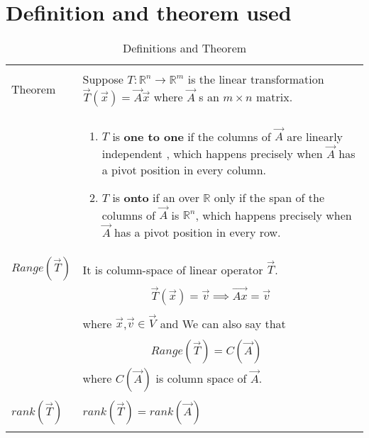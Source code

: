 \documentclass[journal,12pt]{IEEEtran}
\begin{document}
\section{\textbf{Definition and theorem used}}
\renewcommand{\thetable}{1}
\begin{table}[ht!]
\centering
\begin{tabular}{|p{3cm}|p{15cm}|}
    \hline
	\multirow{3}{*}{Theorem} 
	&\\
	& Suppose $T:\mathbb{R}^{n}\rightarrow \mathbb{R}^{m}$ is the linear transformation $\vec{T}(\vec{x})=\vec{A}\vec{x}$ where $\vec{A}$ s an $m\times n$ matrix.\\
	&\\
	&{\begin{enumerate}
	    \item $T$ is \textbf{one to one} if the columns of $\vec{A}$ are linearly independent , which happens precisely when $\vec{A}$ has a pivot position in every column.
	    
	    \item $T$ is \textbf{onto} if an over $\mathbb{R}$  only if the span of the columns of $\vec{A}$ is $\mathbb{R}^{n}$, which happens precisely when $\vec{A}$ has a pivot position in every row.
	\end{enumerate}}\\
	\hline
	\multirow{3}{*}{$Range(\vec{T})$}
	&\\
	& It is column-space of linear operator $\vec{T}$.\\
	&\\
    &$\qquad\qquad\qquad\vec{T}(\vec{x})=\vec{v}
    \implies\vec{Ax}=\vec{v}$\\
    &\\
    & where $\vec{x}$,$\vec{v}\in\vec{V}$ and We can also say that\\
    &\\
    &$\qquad\qquad\qquad Range(\vec{T})=C(\vec{A})\label{R}$\\
    &where $C(\vec{A})$ is column space of $\vec{A}$.\\
    \hline
    \multirow{3}{*}{$rank(\vec{T})$}
    &\\
&$rank(\vec{T})=rank(\vec{A})$\\
&\\
    \hline
\end{tabular}
\label{table:1}
    \caption{Definitions and Theorem }
\end{table}
\newpage
\end{document}
